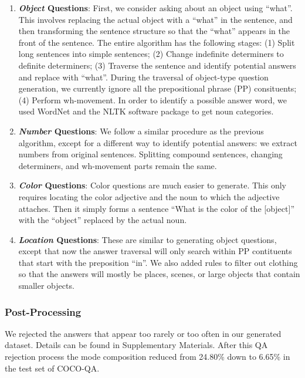 \documentclass{article} %
\renewcommand{\#}[1]{\textbf{#1}}
\begin{document}
\begin{enumerate}[leftmargin=*]

\item \textbf{{\it Object} Questions}: First, we consider asking about an
object using ``what''. This involves  replacing the actual object with a
``what'' in the sentence, and then  transforming the sentence structure so that
the ``what'' appears in the  front of the sentence. The entire algorithm has
the following stages: (1) Split long sentences into simple sentences; (2)
Change indefinite determiners  to definite determiners; (3) Traverse the
sentence and identify potential answers and replace  with ``what''. During the
traversal of object-type question generation,  we currently ignore all the
prepositional phrase (PP) consituents; (4) Perform wh-movement. In order to
identify a possible answer word, we used WordNet \cite{wordnet} and the NLTK
software package \cite{nltk} to get noun categories.

\item \textbf{{\it Number} Questions}: We follow a similar procedure as the
previous algorithm, except for a different way to identify potential answers:
we extract numbers from original sentences. Splitting  compound sentences,
changing determiners, and wh-movement parts remain the same.

\item \textbf{{\it Color} Questions}: Color questions are much easier to
generate. This only requires locating the  color adjective and the noun to
which the adjective attaches. Then it simply  forms a sentence ``What is the
color of the [object]'' with the ``object''  replaced by the actual noun.

\item \textbf{{\it Location} Questions}: These are similar to generating object
questions, except that now the answer traversal will only search within PP
contituents that start with the  preposition ``in''. We also added rules to
filter out clothing so that the  answers will mostly be places, scenes, or
large objects that contain  smaller objects.

\end{enumerate}

\subsubsection{Post-Processing}

We rejected  the answers that appear too rarely or too often in our generated
dataset. Details can be found in Supplementary Materials. After this QA
rejection process the mode composition reduced from 24.80\%  down to 6.65\% in
the test set of COCO-QA.
\end{document}
